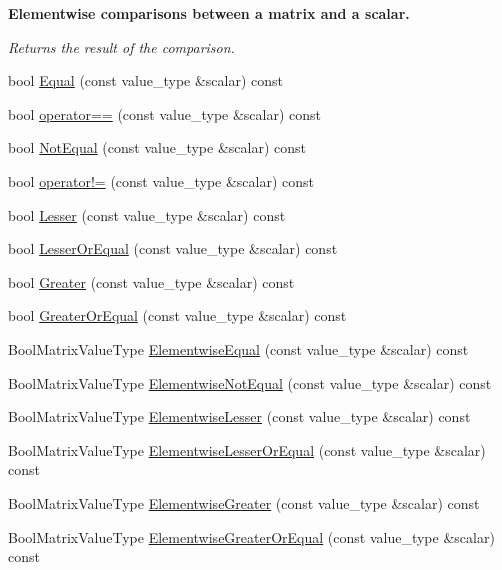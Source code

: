 \begin{Indent}{\bf Elementwise comparisons between a matrix and a scalar.}\par
{\em Returns the result of the comparison. }\begin{DoxyCompactItemize}
\item 
bool \hyperlink{classvct_fixed_size_const_matrix_base_a36ca5ac8c7cbbd004105516500745baf}{Equal} (const value\+\_\+type \&scalar) const 
\item 
bool \hyperlink{classvct_fixed_size_const_matrix_base_a832eede61d79334a7e0fde8916ce9ea0}{operator==} (const value\+\_\+type \&scalar) const 
\item 
bool \hyperlink{classvct_fixed_size_const_matrix_base_a5f29a2fbae7a7f896ebb164b8ce50afd}{Not\+Equal} (const value\+\_\+type \&scalar) const 
\item 
bool \hyperlink{classvct_fixed_size_const_matrix_base_ac801c30c3dbca24f1e1eda638b2d4940}{operator!=} (const value\+\_\+type \&scalar) const 
\item 
bool \hyperlink{classvct_fixed_size_const_matrix_base_ac91aa8965c40898902e4040714ebba1e}{Lesser} (const value\+\_\+type \&scalar) const 
\item 
bool \hyperlink{classvct_fixed_size_const_matrix_base_a1f326162855228b4ad951861f94baede}{Lesser\+Or\+Equal} (const value\+\_\+type \&scalar) const 
\item 
bool \hyperlink{classvct_fixed_size_const_matrix_base_a711d7e0c1e311eda99c2179027790685}{Greater} (const value\+\_\+type \&scalar) const 
\item 
bool \hyperlink{classvct_fixed_size_const_matrix_base_a97bd980245f7123133edd231922b0e77}{Greater\+Or\+Equal} (const value\+\_\+type \&scalar) const 
\item 
Bool\+Matrix\+Value\+Type \hyperlink{classvct_fixed_size_const_matrix_base_ab57c2a6044b81d55564365c2ce227ad3}{Elementwise\+Equal} (const value\+\_\+type \&scalar) const 
\item 
Bool\+Matrix\+Value\+Type \hyperlink{classvct_fixed_size_const_matrix_base_a67c3712172b253e5d69e89841a526998}{Elementwise\+Not\+Equal} (const value\+\_\+type \&scalar) const 
\item 
Bool\+Matrix\+Value\+Type \hyperlink{classvct_fixed_size_const_matrix_base_a2541b7716052fc48983c5c120d9c3271}{Elementwise\+Lesser} (const value\+\_\+type \&scalar) const 
\item 
Bool\+Matrix\+Value\+Type \hyperlink{classvct_fixed_size_const_matrix_base_a15ae9a8d190323603d5900370cc6eaed}{Elementwise\+Lesser\+Or\+Equal} (const value\+\_\+type \&scalar) const 
\item 
Bool\+Matrix\+Value\+Type \hyperlink{classvct_fixed_size_const_matrix_base_a334e8a6640c67d63b4da59effd6c4a09}{Elementwise\+Greater} (const value\+\_\+type \&scalar) const 
\item 
Bool\+Matrix\+Value\+Type \hyperlink{classvct_fixed_size_const_matrix_base_aa6ae540d5cf89b70f1cca6a34adf34e9}{Elementwise\+Greater\+Or\+Equal} (const value\+\_\+type \&scalar) const 
\end{DoxyCompactItemize}
\end{Indent}
